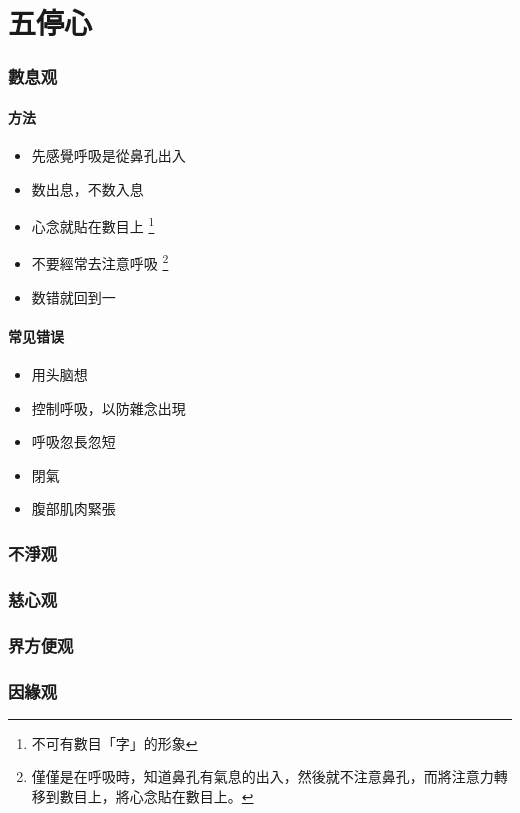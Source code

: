 \section{五停心}

\subsubsection{數息观}
\paragraph{方法}
\begin{itemize}
  \item 先感覺呼吸是從鼻孔出入
  \item 数出息，不数入息
  \item 心念就貼在數目上
    \footnote{不可有數目「字」的形象}
  \item 不要經常去注意呼吸
    \footnote{僅僅是在呼吸時，知道鼻孔有氣息的出入，然後就不注意鼻孔，而將注意力轉移到數目上，將心念貼在數目上。}
  \item 数错就回到一
\end{itemize}
\paragraph{常见错误}
\begin{itemize}
  \item 用头脑想
  \item 控制呼吸，以防雜念出現
  \item 呼吸忽長忽短
  \item 閉氣
  \item 腹部肌肉緊張
\end{itemize}

\subsubsection{不淨观}

\subsubsection{慈心观}

\subsubsection{界方便观}

\subsubsection{因緣观}
